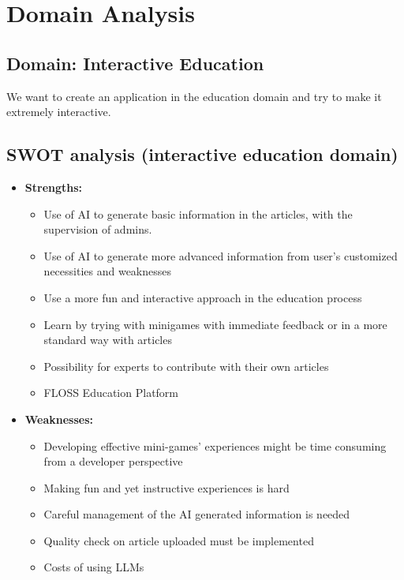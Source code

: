 \section{Domain Analysis} \label{domain-analysis}

\subsection{Domain: Interactive Education}
We want to create an application in the education domain and try to make it extremely interactive.

\subsection{SWOT analysis (interactive education domain)}

\begin{itemize}
	\item \textbf{Strengths:}
		\begin{itemize}
			\item Use of AI to generate basic information in the articles, with the supervision of admins. 
			\item Use of AI to generate more advanced information from user’s customized necessities and weaknesses
			\item Use a more fun and interactive approach in the education process
			\item Learn by trying with minigames with immediate feedback or in a more standard way with articles
			\item Possibility for experts to contribute with their own articles
			\item FLOSS Education Platform
		\end{itemize}
		
	\item \textbf{Weaknesses:}
		\begin{itemize}
			\item Developing effective mini-games’ experiences might be time consuming from a developer perspective
			\item Making fun and yet instructive experiences is hard
			\item Careful management of the AI generated information is needed
			\item Quality check on article uploaded must be implemented
			\item Costs of using LLMs
		\end{itemize}
		

\end{itemize}
